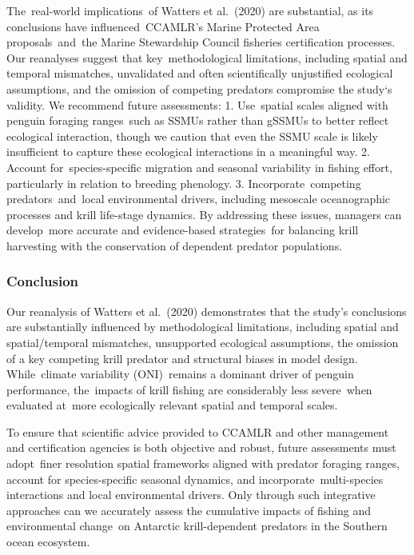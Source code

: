 \documentclass[]{elsarticle} %
\begin{document}
The~real-world implications~of Watters et al.~(2020) are substantial, as
its conclusions have influenced~CCAMLR's Marine Protected Area
proposals~and~the Marine Stewardship Council fisheries certification
processes. Our reanalyses suggest that key~methodological limitations,
including spatial and temporal mismatches, unvalidated and often
scientifically unjustified ecological assumptions, and the omission of
competing predators compromise the study`s validity. We recommend future
assessments: 1. Use~spatial scales aligned with penguin foraging
ranges~such as SSMUs rather than gSSMUs to better reflect ecological
interaction, though we caution that even the SSMU scale is likely
insufficient to capture these ecological interactions in a meaningful
way. 2. Account for~species-specific migration and seasonal variability
in fishing effort, particularly in relation to breeding phenology. 3.
Incorporate~competing predators~and~local environmental drivers,
including mesoscale oceanographic processes and krill life-stage
dynamics. By addressing these issues, managers can develop~more accurate
and evidence-based strategies~for balancing krill harvesting with the
conservation of dependent predator populations.

\subsubsection{Conclusion}\label{conclusion}

Our reanalysis of Watters et al.~(2020) demonstrates that the study's
conclusions are substantially influenced by methodological limitations,
including spatial and spatial/temporal mismatches, unsupported
ecological assumptions, the omission of a key competing krill predator
and structural biases in model design. While~climate variability
(ONI)~remains a dominant driver of penguin performance, the~impacts of
krill fishing are considerably less severe~when evaluated at~more
ecologically relevant spatial and temporal scales.

To ensure that scientific advice provided to CCAMLR and other management
and certification agencies is both objective and robust, future
assessments must adopt~finer resolution spatial frameworks aligned with
predator foraging ranges, account for species-specific seasonal
dynamics, and incorporate~multi-species interactions and local
environmental drivers. Only through such integrative approaches can we
accurately assess the cumulative impacts of fishing and environmental
change~on Antarctic krill-dependent predators in the Southern ocean
ecosystem.

\renewcommand\refname{Citations}

\end{document}
